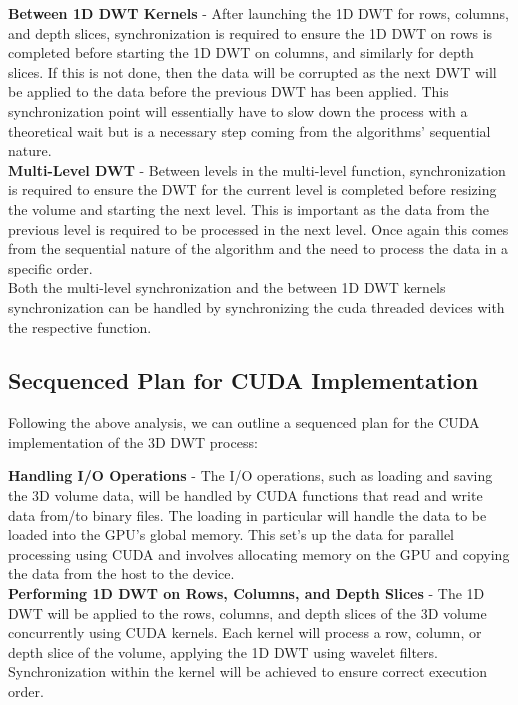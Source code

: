 \documentclass{article}
\begin{document}
\textbf{Between 1D DWT Kernels} - After launching the 1D DWT for rows, columns, and depth slices, synchronization is required to ensure the 1D DWT on rows is completed before starting the 1D DWT on columns, and similarly for depth slices. If this is not done, then the data will be corrupted as the next DWT will be applied to the data before the previous DWT has been applied. This synchronization point will essentially have to slow down the process with a theoretical wait but is a necessary step coming from the algorithms' sequential nature.\\

\textbf{Multi-Level DWT} - Between levels in the multi-level function, synchronization is required to ensure the DWT for the current level is completed before resizing the volume and starting the next level. This is important as the data from the previous level is required to be processed in the next level. Once again this comes from the sequential nature of the algorithm and the need to process the data in a specific order.\\

Both the multi-level synchronization and the between 1D DWT kernels synchronization can be handled by synchronizing the cuda threaded devices with the respective function.\\ 

\subsection{Secquenced Plan for CUDA Implementation}
Following the above analysis, we can outline a sequenced plan for the CUDA implementation of the 3D DWT process:

\textbf{Handling I/O Operations} - The I/O operations, such as loading and saving the 3D volume data, will be handled by CUDA functions that read and write data from/to binary files. The loading in particular will handle the data to be loaded into the GPU's global memory. This set's up the data for parallel processing using CUDA and involves allocating memory on the GPU and copying the data from the host to the device.\\

\textbf{Performing 1D DWT on Rows, Columns, and Depth Slices} - The 1D DWT will be applied to the rows, columns, and depth slices of the 3D volume concurrently using CUDA kernels. Each kernel will process a row, column, or depth slice of the volume, applying the 1D DWT using wavelet filters. Synchronization within the kernel will be achieved to ensure correct execution order.\\
   
\end{document}
